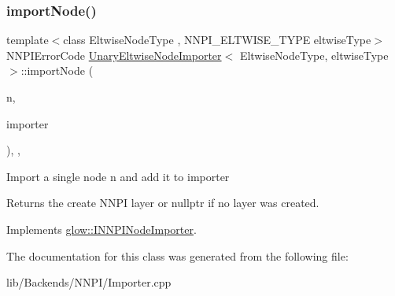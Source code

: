 \subsubsection{\texorpdfstring{import\+Node()}{importNode()}}
{\footnotesize\ttfamily template$<$class Eltwise\+Node\+Type , N\+N\+P\+I\+\_\+\+E\+L\+T\+W\+I\+S\+E\+\_\+\+T\+Y\+PE eltwise\+Type$>$ \\
N\+N\+P\+I\+Error\+Code \hyperlink{class_unary_eltwise_node_importer}{Unary\+Eltwise\+Node\+Importer}$<$ Eltwise\+Node\+Type, eltwise\+Type $>$\+::import\+Node (\begin{DoxyParamCaption}\item[{\hyperlink{classglow_1_1_node}{Node} $\ast$}]{n,  }\item[{\hyperlink{classglow_1_1_n_n_p_i_importer}{N\+N\+P\+I\+Importer} \&}]{importer }\end{DoxyParamCaption})\hspace{0.3cm}{\ttfamily [inline]}, {\ttfamily [override]}, {\ttfamily [virtual]}}

Import a single node {\ttfamily n} and add it to {\ttfamily importer} \begin{DoxyReturn}{Returns}
the create N\+N\+PI layer or nullptr if no layer was created. 
\end{DoxyReturn}


Implements \hyperlink{classglow_1_1_i_n_n_p_i_node_importer_aa861e10cb0c17a92abb94bf613b57807}{glow\+::\+I\+N\+N\+P\+I\+Node\+Importer}.



The documentation for this class was generated from the following file\+:\begin{DoxyCompactItemize}
\item 
lib/\+Backends/\+N\+N\+P\+I/Importer.\+cpp\end{DoxyCompactItemize}
